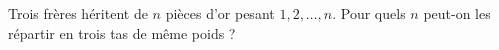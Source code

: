 Trois frères héritent de $n$ pièces d'or pesant $1, 2, \ldots, n$. Pour quels $n$ peut-on les répartir en trois tas de même poids ?
